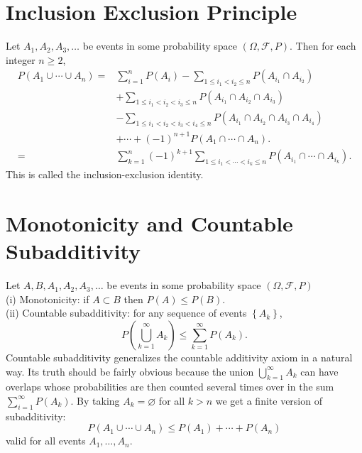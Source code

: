\documentclass[11pt]{elegantbook}
\begin{document}
\section{Inclusion Exclusion Principle}

\begin{theorem}
Let $A_1, A_2, A_3, \ldots$ be events in some probability space $(\Omega, \mathcal{F}, P)$. Then for each integer $n \geq 2$,
$$
\begin{aligned}
P\left(A_1 \cup \cdots \cup A_n\right)= & \sum_{i=1}^n P\left(A_i\right)-\sum_{1 \leq i_1<i_2 \leq n} P\left(A_{i_1} \cap A_{i_2}\right) \\
& +\sum_{1 \leq i_1<i_2<i_3 \leq n} P\left(A_{i_1} \cap A_{i_2} \cap A_{i_3}\right) \\
& -\sum_{1 \leq i_1<i_2<i_3<i_4 \leq n} P\left(A_{i_1} \cap A_{i_2} \cap A_{i_3} \cap A_{i_4}\right) \\
& +\cdots+(-1)^{n+1} P\left(A_1 \cap \cdots \cap A_n\right) . \\
= & \sum_{k=1}^n(-1)^{k+1} \sum_{1 \leq i_1<\cdots<i_k \leq n} P\left(A_{i_1} \cap \cdots \cap A_{i_k}\right) .
\end{aligned}
$$
This is called the inclusion-exclusion identity.
\end{theorem}

\section{Monotonicity and Countable Subadditivity}

\begin{proposition}
Let $A, B, A_1, A_2, A_3, \ldots$ be events in some probability space $(\Omega, \mathcal{F}, P)$\\
(i) Monotonicity: if $A \subset B$ then $P(A) \leq P(B)$.\\
(ii) Countable subadditivity: for any sequence of events $\left\{A_k\right\}$,
$$
P\left(\bigcup_{k=1}^{\infty} A_k\right) \leq \sum_{k=1}^{\infty} P\left(A_k\right) .
$$
Countable subadditivity generalizes the countable additivity axiom in a natural way. Its truth should be fairly obvious because the union $\bigcup_{k=1}^{\infty} A_k$ can have overlaps whose probabilities are then counted several times over in the sum $\sum_{i=1}^{\infty} P\left(A_k\right)$. By taking $A_k=\varnothing$ for all $k>n$ we get a finite version of subadditivity:
$$
P\left(A_1 \cup \cdots \cup A_n\right) \leq P\left(A_1\right)+\cdots+P\left(A_n\right)
$$
valid for all events $A_1, \ldots, A_n$.
\end{proposition}
\end{document}
